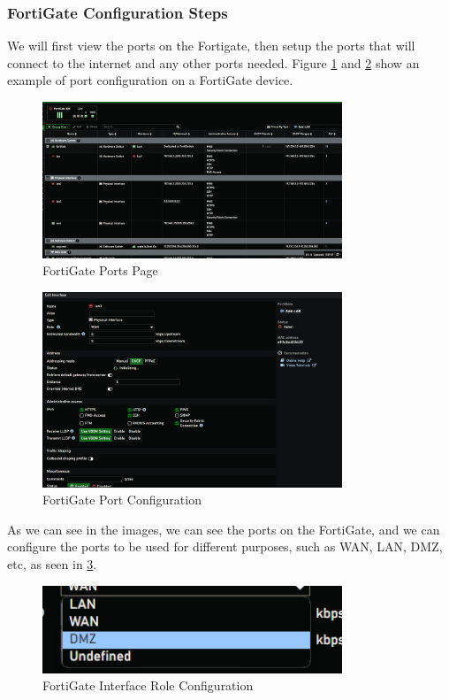 \documentclass[12pt]{report}
\begin{document}
\subsubsection{FortiGate Configuration Steps}
We will first view the ports on the Fortigate, then setup the ports that will connect to the internet and any other ports needed. Figure \ref{fig:ports} and \ref{fig:portscfg} show an example of port configuration on a FortiGate device.
\begin{figure}
    \centering
    \includegraphics[width=0.8\textwidth]{images/Implementation/ports.png}
    \caption{FortiGate Ports Page}
    \label{fig:ports}
\end{figure}
\begin{figure}
    \centering
    \includegraphics[width=0.8\textwidth]{images/Implementation/portconfig.png}
    \caption{FortiGate Port Configuration}
    \label{fig:portscfg}
\end{figure}
As we can see in the images, we can see the ports on the FortiGate, and we can configure the ports to be used for different purposes, such as WAN, LAN, DMZ, etc, as seen in \ref{fig:intrfsrole}.
\begin{figure}
    \centering
    \includegraphics[width=0.8\textwidth]{images/Implementation/intrfsrole.png}
    \caption{FortiGate Interface Role Configuration}
    \label{fig:intrfsrole}
\end{figure}
\end{document}
